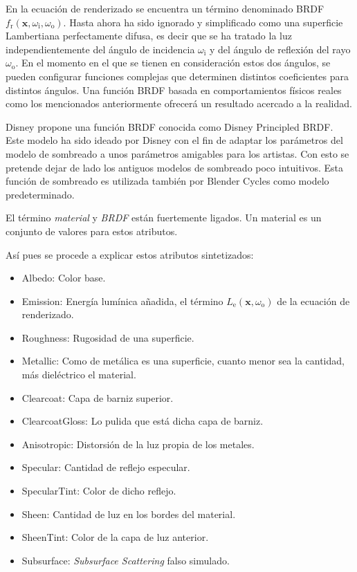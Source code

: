 En la ecuación de renderizado se encuentra un término denominado BRDF $f_{\text{r}}(\mathbf {x} ,\omega _{\text{i}},\omega _{\text{o}})$. Hasta ahora ha sido ignorado y simplificado como una superficie Lambertiana perfectamente difusa, es decir que se ha tratado la luz independientemente del ángulo de incidencia $\omega _{\text{i}}$ y del ángulo de reflexión del rayo $\omega _{\text{o}}$. En el momento en el que se tienen en consideración estos dos ángulos, se pueden configurar funciones complejas que determinen distintos coeficientes para distintos ángulos. Una función BRDF basada en comportamientos físicos reales como los mencionados anteriormente ofrecerá un resultado acercado a la realidad. 
	
Disney propone una función BRDF conocida como Disney Principled BRDF\cite{burley2012physically}. Este modelo ha sido ideado por Disney con el fin de adaptar los parámetros del modelo de sombreado a unos parámetros amigables para los artistas. Con esto se pretende dejar de lado los antiguos modelos de sombreado poco intuitivos. Esta función de sombreado es utilizada también por Blender Cycles como modelo predeterminado.
	
El término \emph{material} y \emph{BRDF} están fuertemente ligados. Un material es un conjunto de valores para estos atributos.
		
Así pues se procede a explicar estos atributos sintetizados:

\begin{itemize}

	\item Albedo: Color base.
	\item Emission: Energía lumínica añadida, el término $L_{\text{e}}(\mathbf {x} ,\omega _{\text{o}})$ de la ecuación de renderizado.
	\item Roughness: Rugosidad de una superficie.
	\item Metallic: Como de metálica es una superficie, cuanto menor sea la cantidad, más dieléctrico el material.
	\item Clearcoat: Capa de barniz superior.
	\item ClearcoatGloss: Lo pulida que está dicha capa de barniz.
	\item Anisotropic: Distorsión de la luz propia de los metales.
	\item Specular: Cantidad de reflejo especular.
	\item SpecularTint: Color de dicho reflejo.
	\item Sheen: Cantidad de luz en los bordes del material.
	\item SheenTint: Color de la capa de luz anterior.
	\item Subsurface: \emph{Subsurface Scattering} falso simulado.
	
\end{itemize}

